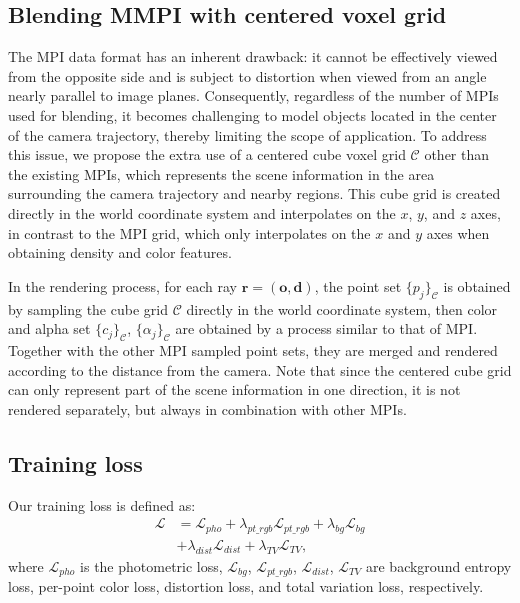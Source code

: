 \documentclass[letterpaper, 10 pt, conference]{ieeeconf}  %
\begin{document}
\subsection{Blending MMPI with centered voxel grid} \label{sec:centervox}

The MPI data format has an inherent drawback: it cannot be effectively viewed from the opposite side and is subject to distortion when viewed from an angle %
nearly parallel to image planes.
Consequently, regardless of the number of MPIs used for blending, it becomes challenging to model objects located in the center of the camera trajectory, thereby limiting the scope of application. To address this issue, we propose the extra use of a centered cube voxel grid $\mathcal{C}$ other than the existing MPIs, which represents the scene information in the area surrounding the camera trajectory and nearby regions. This cube grid is created directly in the world coordinate system and interpolates on the $x$, $y$, and $z$ axes, in contrast to the MPI grid, which only interpolates on the $x$ and $y$ axes when obtaining density and color features. 

In the rendering process, for each ray $\mathbf{r}=(\mathbf{o},\mathbf{d}) $, the point set $\{p_j\}_\mathcal{C}$ is obtained by sampling the cube grid $\mathcal{C}$ directly in the world coordinate system, then color and alpha set $\{c_j\}_\mathcal{C}$, $\{\alpha_j\}_\mathcal{C}$ are obtained by a process similar to that of MPI. Together with the other MPI sampled point sets, they are merged and rendered according to the distance from the camera. Note that since the centered cube grid can only represent part of the scene information in one direction, it is not rendered separately, but always in combination with other MPIs.


\subsection{Training loss}
Our training loss is defined as:
\begin{align}
    \mathcal{L} & = \mathcal{L}_{pho} + \lambda_{pt\_rgb}\mathcal{L}_{pt\_rgb} + \lambda_{bg}\mathcal{L}_{bg} \nonumber\\
    & + \lambda_{dist}\mathcal{L}_{dist} + \lambda_{TV}\mathcal{L}_{TV},
\end{align}
where $\mathcal{L}_{pho}$ is the photometric loss, $\mathcal{L}_{bg}$, $\mathcal{L}_{pt\_rgb}$, $\mathcal{L}_{dist}$, $\mathcal{L}_{TV}$ are background entropy loss, per-point color loss, distortion loss, and total variation loss, respectively.
\end{document}
